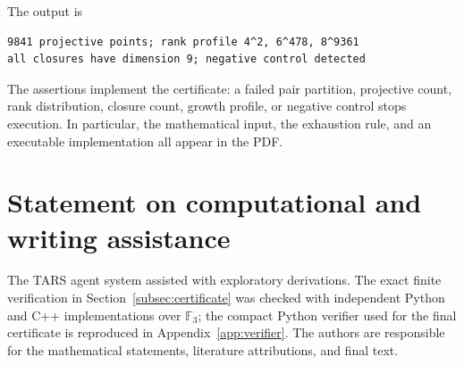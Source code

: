 \documentclass[11pt]{amsart}
\theoremstyle{definition}
\theoremstyle{remark}
\newcommand{\F}{\mathbb F}
\begin{document}
The output is
\begin{verbatim}
9841 projective points; rank profile 4^2, 6^478, 8^9361
all closures have dimension 9; negative control detected
\end{verbatim}
The assertions implement the certificate: a failed pair partition, projective
count, rank distribution, closure count, growth profile, or negative
control stops execution.  In particular, the mathematical input, the
exhaustion rule, and an executable implementation all appear in the PDF.

\section*{Statement on computational and writing assistance}
The TARS agent system assisted with exploratory derivations.  The exact
finite verification in Section~\ref{subsec:certificate} was checked with
independent Python and C++ implementations over $\F_3$; the compact
Python verifier used for the final certificate is reproduced in
Appendix~\ref{app:verifier}.  The authors are responsible for the
mathematical statements, literature attributions, and final text.
\end{document}
